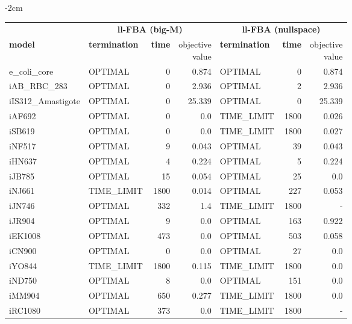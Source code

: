 \begin{table}[!ht]
    \footnotesize
    \centering
    \addtolength{\leftskip} {-2cm}
    \addtolength{\rightskip}{-2cm}
    \begin{tabular}{@{\extracolsep{4pt}}llrrlrr@{}}
    \hline
        \multicolumn{1}{c}{} & \multicolumn{3}{c}{\textbf{ll-FBA (big-M)}} & \multicolumn{3}{c}{\textbf{ll-FBA (nullspace)}}\\ \cline{2-4} \cline{5-7} 
        \textbf{model} & \textbf{termination} & \textbf{time} & \thead{objective \\value} & \textbf{termination} & \textbf{time} & \thead{objective \\value} \\ \hline
        e\_coli\_core & OPTIMAL & 0 & 0.874 & OPTIMAL & 0 & 0.874 \\
        iAB\_RBC\_283 & OPTIMAL & 0 & 2.936 & OPTIMAL & 2 & 2.936 \\
        iIS312\_Amastigote & OPTIMAL & 0 & 25.339 & OPTIMAL & 0 & 25.339 \\
        iAF692 & OPTIMAL & 0 & 0.0 & TIME\_LIMIT & 1800 & 0.026 \\
        iSB619 & OPTIMAL & 0 & 0.0 & TIME\_LIMIT & 1800 & 0.027 \\
        iNF517 & OPTIMAL & 9 & 0.043 & OPTIMAL & 39 & 0.043 \\
        iHN637 & OPTIMAL & 4 & 0.224 & OPTIMAL & 5 & 0.224 \\
        iJB785 & OPTIMAL & 15 & 0.054 & OPTIMAL & 25 & 0.0 \\
        iNJ661 & TIME\_LIMIT & 1800 & 0.014 & OPTIMAL & 227 & 0.053 \\ 
        iJN746 & OPTIMAL & 332 & 1.4 & TIME\_LIMIT & 1800 & - \\
        iJR904 & OPTIMAL & 9 & 0.0 & OPTIMAL & 163 & 0.922 \\
        iEK1008 & OPTIMAL & 473 & 0.0 & OPTIMAL & 503 & 0.058 \\
        iCN900 & OPTIMAL & 0 & 0.0 & OPTIMAL & 27 & 0.0 \\
        iYO844 & TIME\_LIMIT & 1800 & 0.115 & TIME\_LIMIT & 1800 & 0.0 \\
        iND750 & OPTIMAL & 8 & 0.0 & OPTIMAL & 151 & 0.0 \\
        iMM904 & OPTIMAL & 650 & 0.277 & TIME\_LIMIT & 1800 & 0.0 \\
        iRC1080 & OPTIMAL & 373 & 0.0 & TIME\_LIMIT & 1800 & - \\

\end{tabular}
\end{table}

